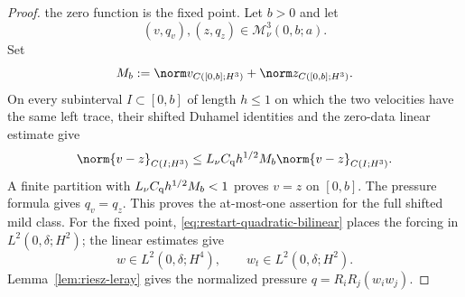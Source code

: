 \begin{proof}
the zero function is the fixed point.  Let \(b>0\) and let
\[
 (v,q_v),(z,q_z)\in\mathscr M_\nu^3(0,b;a).
\]
Set
\[
 M_b:=\norm v_{C([0,b];H^3)}+\norm z_{C([0,b];H^3)}.
\]
On every subinterval \(I\subset[0,b]\) of length \(h\le1\) on which the two
velocities have the same left trace, their shifted Duhamel identities and the
zero-data linear estimate give
\[
 \norm{v-z}_{C(I;H^3)}
 \le L_\nu C_{\rm q}h^{1/2}M_b
 \norm{v-z}_{C(I;H^3)}.
\]
A finite partition with
\(L_\nu C_{\rm q}h^{1/2}M_b<1\) proves \(v=z\) on \([0,b]\).
The pressure formula gives \(q_v=q_z\).  This proves the at-most-one
assertion for the full shifted mild class.  For the fixed point,
\eqref{eq:restart-quadratic-bilinear} places the forcing in
\(L^2(0,\delta;H^2)\); the linear estimates give
\[
 w\in L^2(0,\delta;H^4),
 \qquad
 w_t\in L^2(0,\delta;H^2).
\]
Lemma~\ref{lem:riesz-leray} gives the normalized pressure
\(q=R_iR_j(w_iw_j)\).


\end{proof}
